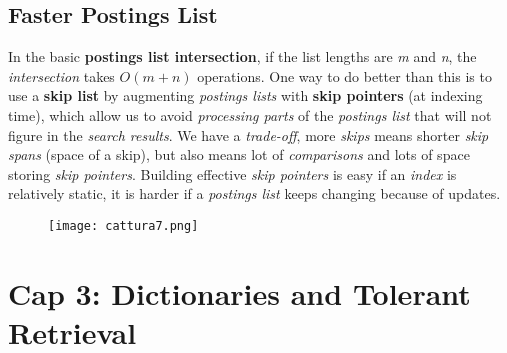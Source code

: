 \documentclass{article}
\begin{document}
\subsection{Faster Postings List}
In the basic \textbf{postings list intersection}, if the list lengths are \emph{m }and \emph{n}, the \emph{intersection} takes $O(m+n)$ operations. One way to do better than this is to use a \textbf{skip list} by augmenting \emph{postings lists} with \textbf{skip pointers} (at indexing time), which allow us to avoid \emph{processing parts} of the \emph{postings list} that will not figure in the \emph{search results}. We have a \emph{trade-off}, more \emph{skips} means shorter\emph{ skip spans} (space of a skip), but also means lot of \emph{comparisons} and lots of space storing \emph{skip pointers}. Building effective \emph{skip pointers} is easy if an \emph{index} is relatively static, it is harder if a \emph{postings list} keeps changing because of updates.
\begin{figure}[H]
  \centering
  \texttt{[image: cattura7.png]}
\end{figure}
\clearpage
\section{Cap 3: Dictionaries and Tolerant Retrieval}
\end{document}
